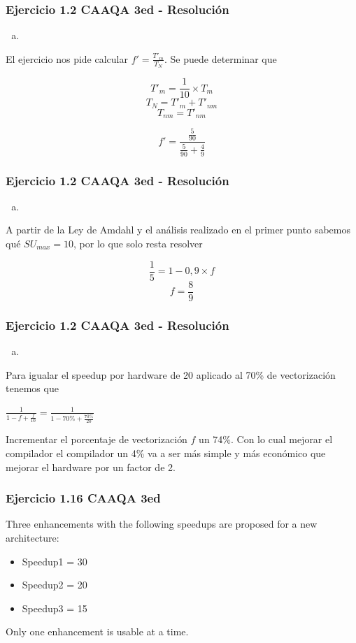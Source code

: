 \documentclass{beamer}
\begin{document}
\begin{frame}
\frametitle{Ejercicio 1.2 CAAQA 3ed - Resolución}
\begin{enumerate}[c.]
\item
\end{enumerate}

  El ejercicio nos pide calcular $f' = \frac{T'_m}{T_N} $. Se puede determinar que
 
 $$ T'_m =  \frac{1}{10} \times T_m $$ 
 $$ T_N = T'_{m} + T'_{nm} $$
 $$ T_{nm} = T'_{nm} $$ 
 
 $$ f' = \frac{\frac{5}{90}}{\frac{5}{90} + \frac{4}{9}} $$
\end{frame}

\begin{frame}
\frametitle{Ejercicio 1.2 CAAQA 3ed - Resolución}
\begin{enumerate}[d.]
\item
\end{enumerate}

A partir de la Ley de Amdahl y el análisis realizado en el primer punto sabemos qué $SU_{max} = 10$, por lo que solo resta resolver

 $$ \frac{1}{5} = 1 - 0,9 \times f $$
 $$ f = \frac{8}{9} $$ 
 
\end{frame}

\begin{frame}
\frametitle{Ejercicio 1.2 CAAQA 3ed - Resolución}
\begin{enumerate}[e.]
\item
\end{enumerate}
Para igualar el speedup por hardware de 20 aplicado al 70\% de vectorización tenemos que 

\bigskip
$\frac{1}{1-f+\frac{f}{10}} = \frac{1}{1-70\%+\frac{70\%}{20}}$

\bigskip
Incrementar el porcentaje de vectorización $f$ un 74\%. Con lo cual mejorar el compilador el compilador un 4\% va a ser más simple y más económico que mejorar el hardware por un factor de 2.


\end{frame}


\begin{frame}
\frametitle{Ejercicio 1.16 CAAQA 3ed}

Three enhancements with the following speedups are proposed for a new architecture:
\bigskip
\begin{itemize}
\item Speedup1 = 30 
\item Speedup2 = 20 
\item Speedup3 = 15
\end{itemize}
\bigskip
Only one enhancement is usable at a time.
\end{frame}
\end{document}
